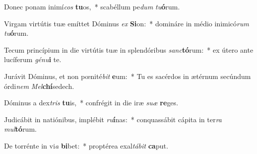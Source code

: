\item Donec ponam inimí\textit{cos} \textbf{tu}os,~* scabéllum pe\textit{dum} \textit{tu}\textbf{ó}rum.
\item Virgam virtútis tuæ emíttet Dóminus \textit{ex} \textbf{Si}on:~* domináre in médio inimicó\textit{rum} \textit{tu}\textbf{ó}rum.
\item Tecum princípium in die virtútis tuæ in splendóribus \textit{sanc}\textbf{tó}rum:~* ex útero ante lucíferum \textit{gé}\textit{nu}\textbf{i} te.
\item Jurávit Dóminus, et non pœnité\textit{bit} \textbf{e}um:~* Tu es sacérdos in ætérnum secúndum órdi\textit{nem} \textit{Mel}\textbf{chí}sedech.
\item Dóminus a dex\textit{tris} \textbf{tu}is,~* confrégit in die iræ \textit{su}\textit{æ} \textbf{re}ges.
\item Judicábit in natiónibus, implébit \textit{ru}\textbf{í}nas:~* conquassábit cápita in ter\textit{ra} \textit{mul}\textbf{tó}rum.
\item De torrénte in vi\textit{a} \textbf{bi}bet:~* proptérea exal\textit{tá}\textit{bit} \textbf{ca}put.
